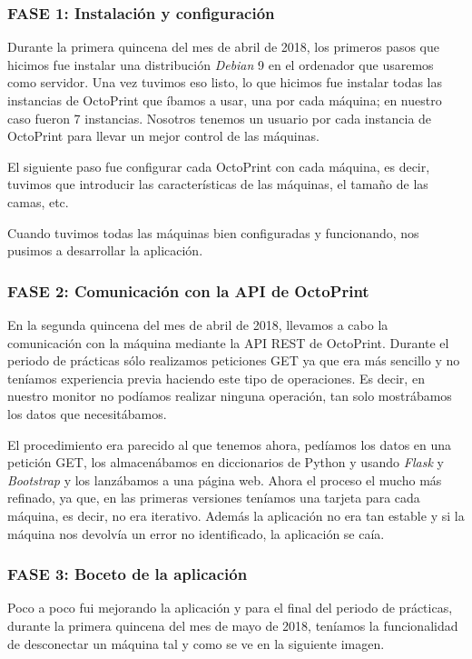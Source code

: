 \subsubsection{FASE 1: Instalación y configuración}

Durante la primera quincena del mes de abril de 2018, los primeros pasos que hicimos fue instalar una distribución \textit{Debian} 9 en el ordenador que usaremos como servidor. Una vez tuvimos eso listo, lo que hicimos fue instalar todas las instancias de OctoPrint que íbamos a usar, una por cada máquina; en nuestro caso fueron 7 instancias. 
Nosotros tenemos un usuario por cada instancia de OctoPrint para llevar un mejor control de las máquinas. 

El siguiente paso fue configurar cada OctoPrint con cada máquina, es decir, tuvimos que introducir las características de las máquinas, el tamaño de las camas, etc.

Cuando tuvimos todas las máquinas bien configuradas y funcionando, nos pusimos a desarrollar la aplicación.

\subsubsection{FASE 2: Comunicación con la API de OctoPrint}

En la segunda quincena del mes de abril de 2018, llevamos a cabo la comunicación con la máquina mediante la API REST de OctoPrint. Durante el periodo de prácticas sólo realizamos peticiones GET ya que era más sencillo y no teníamos experiencia previa haciendo este tipo de operaciones. Es decir, en nuestro monitor no podíamos realizar ninguna operación, tan solo mostrábamos los datos que necesitábamos.

El procedimiento era parecido al que tenemos ahora, pedíamos los datos en una petición GET, los almacenábamos en diccionarios de Python y usando \textit{Flask} y \textit{Bootstrap} y los lanzábamos a una página web. 
Ahora el proceso el mucho más refinado, ya que, en las primeras versiones teníamos una tarjeta para cada máquina, es decir, no era iterativo. Además la aplicación no era tan estable y si la máquina nos devolvía un error no identificado, la aplicación se caía.

\subsubsection{FASE 3: Boceto de la aplicación}

Poco a poco fui mejorando la aplicación y para el final del periodo de prácticas, durante la primera quincena del mes de mayo de 2018, teníamos la funcionalidad de desconectar un máquina tal y como se ve en la siguiente imagen.

